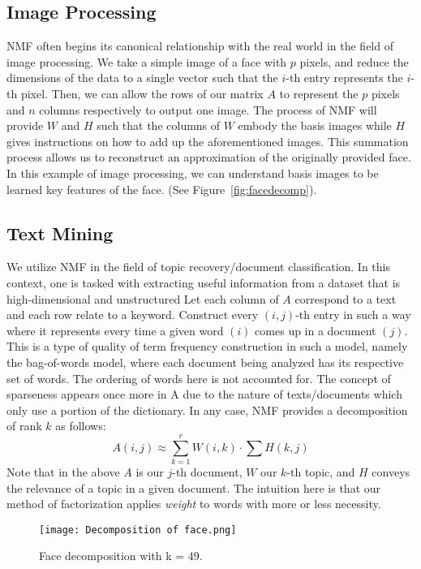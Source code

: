 \documentclass[
10pt, %
a4paper, %
oneside, %
headinclude,footinclude, %
BCOR5mm, %
]{scrartcl}
\begin{document}
\subsection{Image Processing}
NMF often begins its canonical relationship with the real world in the field of image processing. We take a simple image of a face with $p$ pixels, and reduce the dimensions of the data to a single vector such that the $i$-th entry represents the $i$-th pixel. Then, we can allow the rows of our matrix $A$ to represent the $p$ pixels and $n$ columns respectively to output one image. The process of NMF will provide $W$ and $H$ such that the columns of $W$ embody the basis images while $H$ gives instructions on how to add up the aforementioned images. This summation process allows us to reconstruct an approximation of the originally provided face\cite{colyer_2019}. In this example of image processing, we can understand basis images to be learned key features of the face. (See Figure~\vref{fig:facedecomp}).

\subsection{Text Mining}
We utilize NMF in the field of topic recovery/document classification.
In this context, one is tasked with extracting useful information from a dataset that is high-dimensional and unstructured Let each column of $A$ correspond to a text and each row relate to a keyword.
Construct every $(i,j)$-th entry in such a way where it represents every time a given word $(i)$ comes up in a document $(j)$. \cite{colyer_2019}
This is a type of quality of term frequency construction in such a model, namely the bag-of-words model, where each document being analyzed has its respective set of words. The ordering of words here is not accounted for.
The concept of sparseness appears once more in A due to the nature of texts/documents which only use a portion of the dictionary. In any case, NMF provides a decomposition of rank $k$ as follows:
$$A(i,j)\approx\sum_{k=1}^{r}W(i,k)\cdot\sum H(k,j)$$
Note that in the above $A$ is our $j$-th document, $W$ our $k$-th topic, and $H$ conveys the relevance of a topic in a given document. The intuition here is that our method of factorization applies \textit{weight} to words with more or less necessity.

\begin{figure}[tb]
    \centering
    \texttt{[image: Decomposition of face.png]}
    \caption[Face Decomposition Using NMF]{Face decomposition with k = 49. \cite{colyer_2019}}
    \label{fig:facedecomp}
\end{figure}
\end{document}
